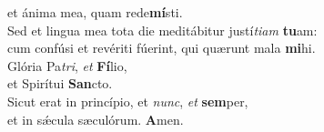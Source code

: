 \evenverse et ánima mea, quam rede\textbf{mí}sti.\\
\oddverse Sed et lingua mea tota die meditábitur justí\textit{ti}\textit{am} \textbf{tu}am:~\*\\
\oddverse cum confúsi et revériti fúerint, qui quærunt mala \textbf{mi}hi.\\
\evenverse Glória Pa\textit{tri}, \textit{et} \textbf{Fí}lio,~\*\\
\evenverse et Spirítui \textbf{San}cto.\\
\oddverse Sicut erat in princípio, et \textit{nunc}, \textit{et} \textbf{sem}per,~\*\\
\oddverse et in sǽcula sæculórum. \textbf{A}men.\\
